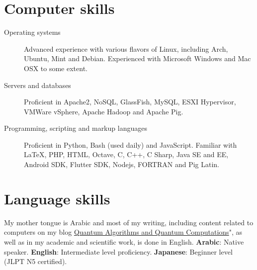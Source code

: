 \documentclass[margin,line]{resume}
\begin{document}
\begin{resume}
\begin{itemize}
	\end{itemize}




	\section{\mysidestyle Computer skills}\vspace{1mm}
	\begin{description}
		\item[Operating systems] Advanced experience with various flavors of Linux, including Arch, Ubuntu, Mint and Debian. Experienced with Microsoft Windows and Mac OSX to some extent.
		\item[Servers and databases] Proficient in Apache2, NoSQL, GlassFish, MySQL, ESXI Hypervisor, VMWare vSphere, Apache Hadoop and Apache Pig.
		\item[Programming, scripting and markup languages] Proficient in Python, Bash (used daily) and JavaScript. Familiar with \LaTeX, PHP, HTML, Octave, C, C++, C Sharp, Java SE and EE, Android SDK, Flutter SDK, Nodejs, FORTRAN and Pig Latin.
	\end{description}


	\section{\mysidestyle Language skills}
	My mother tongue is Arabic and most of my writing, including content related to computers on my blog  \href{https://qaqcblog.quora.com/}{Quantum Algorithms and Quantum Computations}", as well as in my academic and scientific work, is done in English.
	\textbf{Arabic}: Native speaker.
	\textbf{English}: Intermediate level proficiency.
	\textbf{Japanese}: Beginner level (JLPT N5 certified).

\end{resume}
\end{document}
